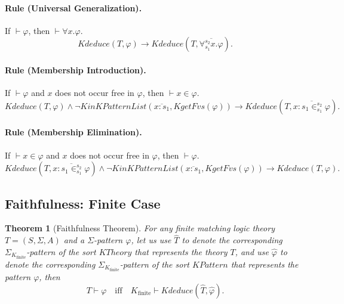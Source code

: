 \documentclass[UTF8,11pt]{article}
\newcounter{thmcounter}
\theoremstyle{plain}
\newtheorem{theorem}    [thmcounter]{Theorem}
\theoremstyle{definition}
\theoremstyle{remark}
\newcommand{\cln}{{:}}
\newcommand{\Kfinite}{{K_\text{finite}}}
\newcommand{\KinKPatternList}{\mathit{KinKPatternList}}
\newcommand{\KPattern}{\mathit{KPattern}}
\newcommand{\KgetFvs}{\mathit{KgetFvs}}
\newcommand{\KTheory}{\mathit{KTheory}}
\newcommand{\Kdeduce}{\mathit{Kdeduce}}
\begin{document}
\paragraph{Rule (Universal Generalization).}
If $\vdash \varphi$, then $\vdash \forall x . \varphi$.
\begin{equation*}
\Kdeduce(T, \varphi) \to \Kdeduce(T, \overline{\forall_{s_1}^{s_2} x . \varphi}).
\end{equation*}

\paragraph{Rule (Membership Introduction).}
If $\vdash \varphi$ and $x$ does not occur free in $\varphi$, then $\vdash x \in \varphi$.
\begin{equation*}
\Kdeduce(T, \varphi) \wedge \neg \KinKPatternList(\overline{x \cln s_1}, \KgetFvs(\varphi)) \to \Kdeduce(T, \overline{x \cln s_1 \in_{s_1}^{s_2} \varphi}).
\end{equation*}

\paragraph{Rule (Membership Elimination).}
If $\vdash x \in \varphi$ and $x$ does not occur free in $\varphi$, then $\vdash \varphi$.
\begin{equation*}
\Kdeduce(T, \overline{x \cln s_1 \in_{s_1}^{s_2} \varphi}) \wedge\neg \KinKPatternList(\overline{x \cln s_1}, \KgetFvs(\varphi)) \to \Kdeduce(T, \varphi).
\end{equation*}

\subsection{Faithfulness: Finite Case}

\begin{theorem}[Faithfulness Theorem]\label{thm:faithfulness-finite}
	For any finite matching logic theory $T = (S, \Sigma, A)$ and a $\Sigma$-pattern $\varphi$, let us use $\hat{T}$ to denote the corresponding $\Sigma_\Kfinite$-pattern of the sort $\KTheory$ that represents the theory $T$, and use $\hat{\varphi}$ to denote the corresponding $\Sigma_\Kfinite$-pattern of the sort $\KPattern$ that represents the pattern $\varphi$, then
	$$T \vdash \varphi \quad \text{iff} \quad \Kfinite \vdash \Kdeduce(\hat{T}, \hat{\varphi}).$$
\end{theorem}
\end{document}
